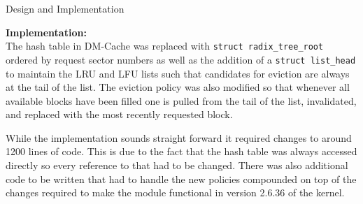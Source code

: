 \documentclass[final,12pt]{beamer}
\begin{document}
\begin{frame}{}
\begin{block}{\large Design and Implementation}

    \vspace{\baselineskip}

    \textbf{Implementation:} \\

    The hash table in DM-Cache was replaced with \texttt{struct
      radix\_tree\_root} ordered by request sector numbers as well as the
    addition of a \texttt{struct list\_head} to maintain the LRU and LFU lists
    such that candidates for eviction are always at the tail of the list. The
    eviction policy was also modified so that whenever all available blocks have
    been filled one is pulled from the tail of the list, invalidated, and
    replaced with the most recently requested block.

    \vspace{\baselineskip}

    While the implementation sounds straight forward it required changes to
    around 1200 lines of code. This is due to the fact that the hash table was
    always accessed directly so every reference to that had to be changed. There
    was also additional code to be written that had to handle the new policies
    compounded on top of the changes required to make the module functional in
    version 2.6.36 of the kernel.

  \end{block}

  \begin{columns}


\end{columns}
\end{frame}
\end{document}
